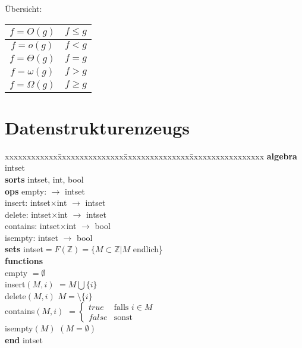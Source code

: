 \documentclass[12pt, twoside]{article}
\begin{document}
Übersicht: \\

\begin{tabular}{| c |  c |}
\hline
$f=O(g)$  & $f \le g $ \\
\hline
$f=o(g)$ & $f < g$ \\
\hline
$f=\Theta(g)$ & $f=g$ \\
\hline
$f=\omega(g)$ & $f>g$ \\
\hline
$f=\Omega(g)$ & $f\ge g$ \\
\hline
\end{tabular}



\section{Datenstrukturenzeugs}

\begin{tabbing}
xxxxxxxxxxxx\=xxxxxxxxxxxxxxx\=xxxxxxxxxxxxxxx\=xxxxxxxxxxxxxxxxx\kill
\textbf{algebra}    \> intset \> \> \\
\textbf{sorts}      \> intset, int, bool \> \> \\
\textbf{ops}   \> empty: \>           \> $\to$ intset   \\
  \> insert:   \> intset$\times$int \> $\to$ intset \\
  \> delete:   \> intset$\times$int \> $\to$ intset \\
  \> contains: \> intset$\times$int \> $\to$ bool   \\
  \> isempty:  \> intset            \> $\to$ bool   \\
\textbf{sets}  \> intset$=F( \mathbb{Z} )=\{M \subset \mathbb{Z}|M$  endlich\} \> \> \\ 
\textbf{functions} \\
 \> empty \> \> $=\emptyset$ \\
 \> insert$(M, i)$ \> \> $=M\bigcup\{i\}$ \\
 \> delete$(M,i)$ \> \> $M=\setminus \{i\}$ \\
 \> contains$(M,i)$ \> \> $
   =
   \begin{cases}
     true  & \text{falls } i \in M \\
     false    &  \text{sonst} 
   \end{cases}
$\\
 \> isempty$(M)$ \> \> $(M= \emptyset )$ \\
\textbf{end} intset \\
\end{tabbing}
\end{document}
